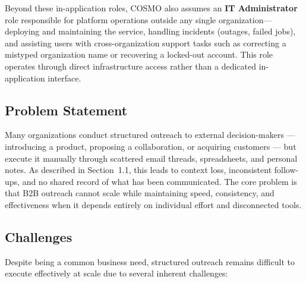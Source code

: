 \documentclass[a4paper]{article}
\begin{document}
Beyond these in-application roles, COSMO also assumes an 
\textbf{IT Administrator} role responsible for platform operations 
outside any single organization---deploying and maintaining the 
service, handling incidents (outages, failed jobs), and assisting 
users with cross-organization support tasks such as correcting a 
mistyped organization name or recovering a locked-out account. 
This role operates through direct infrastructure access rather 
than a dedicated in-application interface.



\subsection{Problem Statement}

Many organizations conduct structured outreach to external
decision-makers — introducing a product, proposing a
collaboration, or acquiring customers — but execute it manually
through scattered email threads, spreadsheets, and personal notes.
As described in Section~1.1, this leads to context loss,
inconsistent follow-ups, and no shared record of what has been
communicated. The core problem is that B2B outreach cannot scale
while maintaining speed, consistency, and effectiveness when it
depends entirely on individual effort and disconnected tools.

\subsection{Challenges}

Despite being a common business need, structured outreach remains difficult to execute effectively at scale due to several inherent challenges:
\end{document}
